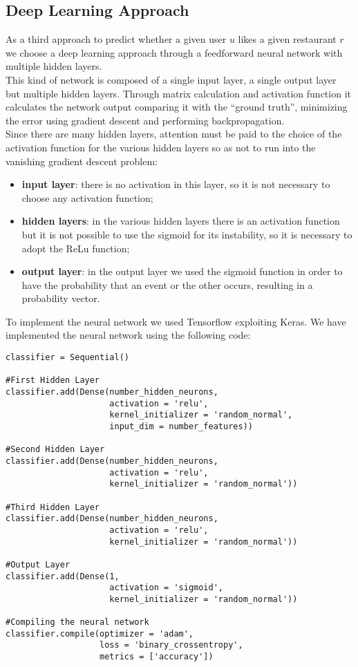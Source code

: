 \subsection{Deep Learning Approach}
As a third approach to predict whether a given user $u$ likes a given restaurant $r$ we choose a deep learning approach through a feedforward neural network with multiple hidden layers.\\
This kind of network is composed of a single input layer, a single output layer but multiple hidden layers. Through matrix calculation and activation function it calculates the network output comparing it with the ``ground truth'', minimizing the error using gradient descent and performing backpropagation.\\
Since there are many hidden layers, attention must be paid to the choice of the activation function for the various hidden layers so as not to run into the vanishing gradient descent problem:
\begin{itemize}
\item \textbf{input layer}: there is no activation in this layer, so it is not necessary to choose any activation function;
\item \textbf{hidden layers}: in the various hidden layers there is an activation function but it is not possible to use the sigmoid for its instability, so it is necessary to adopt the ReLu function;
\item \textbf{output layer}: in the output layer we used the sigmoid function in order to have the probability that an event or the other occurs, resulting in a probability vector.
\end{itemize}

To implement the neural network we used Tensorflow exploiting Keras. We have implemented the neural network using the following code:

\begin{lstlisting}
classifier = Sequential()

#First Hidden Layer
classifier.add(Dense(number_hidden_neurons, 
                     activation = 'relu', 
                     kernel_initializer = 'random_normal', 
                     input_dim = number_features))

#Second Hidden Layer
classifier.add(Dense(number_hidden_neurons, 
                     activation = 'relu', 
                     kernel_initializer = 'random_normal'))

#Third Hidden Layer
classifier.add(Dense(number_hidden_neurons, 
                     activation = 'relu', 
                     kernel_initializer = 'random_normal'))

#Output Layer
classifier.add(Dense(1, 
                     activation = 'sigmoid', 
                     kernel_initializer = 'random_normal'))

#Compiling the neural network
classifier.compile(optimizer = 'adam', 
                   loss = 'binary_crossentropy', 
                   metrics = ['accuracy'])
\end{lstlisting}

